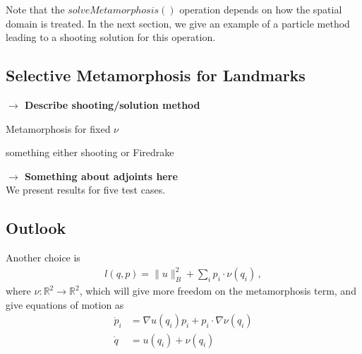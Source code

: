 \documentclass{article}
\begin{document}
Note that the $solveMetamorphosis()$ operation depends on how the spatial domain
is treated. In the next section, we give an example of a particle method leading
to a shooting solution for this operation.

\subsection{Selective Metamorphosis for Landmarks}\label{sec:numerical}

\textbf{$\longrightarrow$ Describe shooting/solution method}\\

\begin{algorithm}[h!]
\begin{algorithmic}
\caption{Metamorphosis for fixed $\nu$}
\State something either shooting or Firedrake
\EndProcedure
\end{algorithmic}
\end{algorithm}

\textbf{$\longrightarrow$ Something about adjoints here}\\


We present results for five test cases.






\subsection{Outlook}\label{sec:outlook}
Another choice is 
\begin{align}
    l(q,p) = \|u\|_B^2 + \sum_i p_i\cdot \nu(q_i) \, , 
\end{align}
where $\nu:\mathbb R^2 \to \mathbb R^2$, which will give more freedom on the metamorphosis term, and give equations of motion as 
\begin{align}
    \dot p_i  &= \nabla u(q_i)p_i  + p_i \cdot \nabla \nu(q_i)\\
    \dot q &= u(q_i) + \nu(q_i) 
\end{align}
\end{document}
